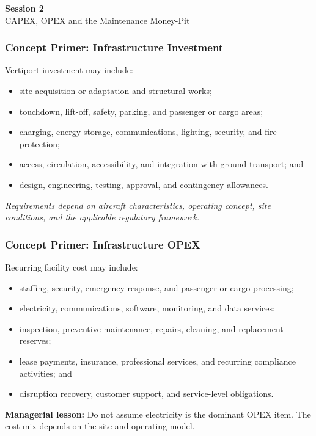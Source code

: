 \documentclass{beamer}
\begin{document}
\begin{frame}[c]
  \begin{center}
    \huge\color{cuhkpurple}\textbf{Session 2}\\
    \vspace{0.5cm}
    \Large CAPEX, OPEX and the Maintenance Money-Pit
  \end{center}
\end{frame}

\begin{frame}[t]
\frametitle{Concept Primer: Infrastructure Investment}
Vertiport investment may include:
\begin{itemize}
\item site acquisition or adaptation and structural works;
\item touchdown, lift-off, safety, parking, and passenger or cargo areas;
\item charging, energy storage, communications, lighting, security, and fire protection;
\item access, circulation, accessibility, and integration with ground transport; and
\item design, engineering, testing, approval, and contingency allowances.
\end{itemize}
\textit{Requirements depend on aircraft characteristics, operating concept, site conditions, and the applicable regulatory framework.}
\end{frame}

\begin{frame}[t]
\frametitle{Concept Primer: Infrastructure OPEX}
Recurring facility cost may include:
\begin{itemize}
\item staffing, security, emergency response, and passenger or cargo processing;
\item electricity, communications, software, monitoring, and data services;
\item inspection, preventive maintenance, repairs, cleaning, and replacement reserves;
\item lease payments, insurance, professional services, and recurring compliance activities; and
\item disruption recovery, customer support, and service-level obligations.
\end{itemize}
\textbf{Managerial lesson:} Do not assume electricity is the dominant OPEX item. The cost mix depends on the site and operating model.
\end{frame}
\end{document}
